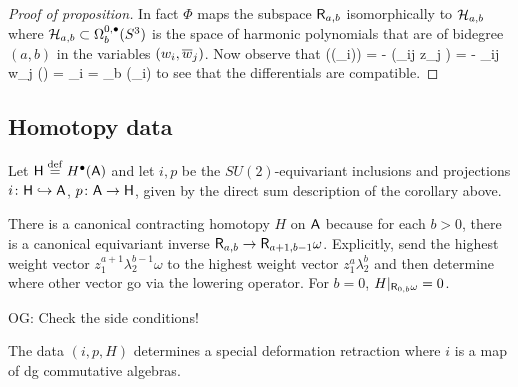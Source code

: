 \documentclass[11pt]{amsart}
\renewcommand{\op}{\operatorname}
\def\owen#1{{\textcolor{violet!65!black}{OG: {#1}}}}
\begin{document}
%

\begin{proof}[Proof of proposition]
In fact $\Phi$ maps the subspace $\sfR_{a,b}$ isomorphically to $\cH_{a,b}$ where $\cH_{a,b} \subset \Omega^{0,\bu}_b (S^3)$ is the space of harmonic polynomials that are of bidegree $(a,b)$ in the variables $(w_i,\Bar{w}_j)$.
Now observe that
\beqn
\Phi(\dbar(\lambda_i)) = - \Phi(\ep_{ij} z_j \omega) = - \ep_{ij} w_j \Phi (\omega) = \xi_i = \dbar_b \Phi (\lambda_i) 
\eeqn
to see that the differentials are compatible.
\end{proof}

\subsection{Homotopy data}

Let $\sfH \define H^\bu(\sfA)$ and let $i,p$ be the $SU(2)$-equivariant inclusions and projections $i \colon \sfH \hookrightarrow \sfA$, $p \colon \sfA \to \sfH$, given by the direct sum description of the corollary above.

There is a canonical contracting homotopy $H$ on $\sfA$ 
because for each $b > 0$, there is a canonical equivariant inverse $\sfR_{a,b} \to \sfR_{a+1,b-1} \omega$.
Explicitly, send the highest weight vector $z_1^{a+1} \lambda_2^{b-1} \omega$ to the highest weight vector $z_1^{a} \lambda_2^{b}$ and then determine where other vector go via the lowering operator.
For $b = 0$, $H|_{\sfR_{0,b}\omega} = 0$.

\owen{Check the side conditions!}

\begin{lem}
The data $(i,p,H)$ determines a special deformation retraction where $i$ is a map of dg commutative algebras.
\end{lem}
\end{document}
